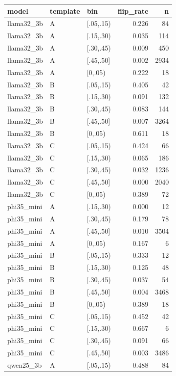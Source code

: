 \begin{tabular}{lllrr}
\toprule
model & template & bin & flip\_rate & n \\
\midrule
llama32\_3b & A & [.05,.15) & 0.226 & 84 \\
llama32\_3b & A & [.15,.30) & 0.035 & 114 \\
llama32\_3b & A & [.30,.45) & 0.009 & 450 \\
llama32\_3b & A & [.45,.50] & 0.002 & 2934 \\
llama32\_3b & A & [0,.05) & 0.222 & 18 \\
llama32\_3b & B & [.05,.15) & 0.405 & 42 \\
llama32\_3b & B & [.15,.30) & 0.091 & 132 \\
llama32\_3b & B & [.30,.45) & 0.083 & 144 \\
llama32\_3b & B & [.45,.50] & 0.007 & 3264 \\
llama32\_3b & B & [0,.05) & 0.611 & 18 \\
llama32\_3b & C & [.05,.15) & 0.424 & 66 \\
llama32\_3b & C & [.15,.30) & 0.065 & 186 \\
llama32\_3b & C & [.30,.45) & 0.032 & 1236 \\
llama32\_3b & C & [.45,.50] & 0.000 & 2040 \\
llama32\_3b & C & [0,.05) & 0.389 & 72 \\
phi35\_mini & A & [.15,.30) & 0.000 & 12 \\
phi35\_mini & A & [.30,.45) & 0.179 & 78 \\
phi35\_mini & A & [.45,.50] & 0.010 & 3504 \\
phi35\_mini & A & [0,.05) & 0.167 & 6 \\
phi35\_mini & B & [.05,.15) & 0.333 & 12 \\
phi35\_mini & B & [.15,.30) & 0.125 & 48 \\
phi35\_mini & B & [.30,.45) & 0.037 & 54 \\
phi35\_mini & B & [.45,.50] & 0.004 & 3468 \\
phi35\_mini & B & [0,.05) & 0.389 & 18 \\
phi35\_mini & C & [.05,.15) & 0.452 & 42 \\
phi35\_mini & C & [.15,.30) & 0.667 & 6 \\
phi35\_mini & C & [.30,.45) & 0.091 & 66 \\
phi35\_mini & C & [.45,.50] & 0.003 & 3486 \\
qwen25\_3b & A & [.05,.15) & 0.488 & 84 \\

\end{tabular}

